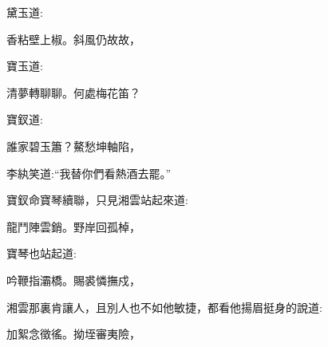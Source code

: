 \begin{parag}
    黛玉道:
\end{parag}


\begin{poem}
    \begin{pl} 香粘壁上椒。斜風仍故故，\end{pl}
\end{poem}


\begin{parag}
    寶玉道:
\end{parag}


\begin{poem}
    \begin{pl} 清夢轉聊聊。何處梅花笛？\end{pl}
\end{poem}


\begin{parag}
    寶釵道:
\end{parag}


\begin{poem}
    \begin{pl} 誰家碧玉簫？鰲愁坤軸陷，\end{pl}
\end{poem}


\begin{parag}
    李紈笑道:“我替你們看熱酒去罷。”
\end{parag}


\begin{parag}
    寶釵命寶琴續聯，只見湘雲站起來道:
\end{parag}


\begin{poem}
    \begin{pl} 龍鬥陣雲銷。野岸回孤棹，\end{pl}
\end{poem}


\begin{parag}
    寶琴也站起道:
\end{parag}


\begin{poem}
    \begin{pl} 吟鞭指灞橋。賜裘憐撫戍，\end{pl}
\end{poem}


\begin{parag}
    湘雲那裏肯讓人，且別人也不如他敏捷，都看他揚眉挺身的說道:
\end{parag}


\begin{poem}
    \begin{pl} 加絮念徵徭。拗垤審夷險，\end{pl}
\end{poem}


